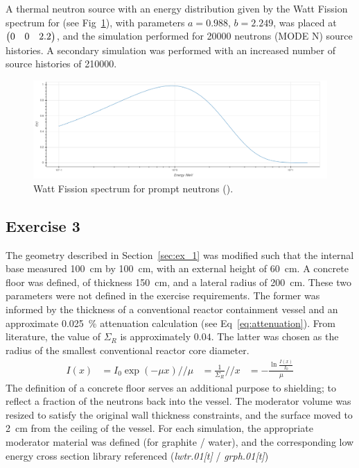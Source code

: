 \documentclass{article}
\begin{document}
    A thermal neutron source with an energy distribution given by the Watt Fission spectrum for  (see Fig~\ref{fig:watt_fission}), with parameters $a=0.988$, $b=2.249$, was placed at $\mqty(0 & 0 & 2.2)$, and the simulation performed for \num{20000} neutrons (MODE N) source histories. A secondary simulation was performed with an increased number of source histories of \num{210000}.
    \begin{figure}[htb]
      \centering
      \includegraphics[width=\textwidth]{watt_spectrum_235_u.png}
      \caption{Watt Fission spectrum for prompt neutrons ().} %
      \label{fig:watt_fission}
    \end{figure}

  \subsection{Exercise 3}
    The geometry described in Section~\ref{sec:ex_1} was modified such that the internal base measured \SI{100}{\cm} by \SI{100}{\cm}, with an external height of \SI{60}{\cm}.
    A concrete floor was defined, of thickness \SI{150}{\cm}, and a lateral radius of \SI{200}{\cm}. These two parameters were not defined in the exercise requirements. The former was informed by the thickness of a conventional reactor containment vessel\cite{nuclear_reactors} and an approximate \SI{0.025}{\percent} attenuation calculation (see Eq~\ref{eq:attenuation}). From literature, the value of $\Sigma_R$ is approximately $0.04$\cite{neutrons}. The latter was chosen as the radius of the smallest conventional reactor core diameter. %
    \begin{align}
      \label{eq:attenuation}
      I(x)&=I_0\exp(-\mu x) //
      \mu &= \frac{1}{\Sigma_R}//
      x &= -\frac{\ln{\frac{I(x)}{I_0}}}{\mu}
    \end{align}
    The definition of a concrete floor serves an additional purpose to shielding; to reflect a fraction of the neutrons back into the vessel.
    The moderator volume was resized to satisfy the original wall thickness constraints, and the surface moved to \SI{2}{\cm} from the ceiling of the vessel. For each simulation, the appropriate moderator material was defined (for graphite / water), and the corresponding low energy cross section library referenced (\textit{lwtr.01[t]} / \textit{grph.01[t]})
\end{document}
